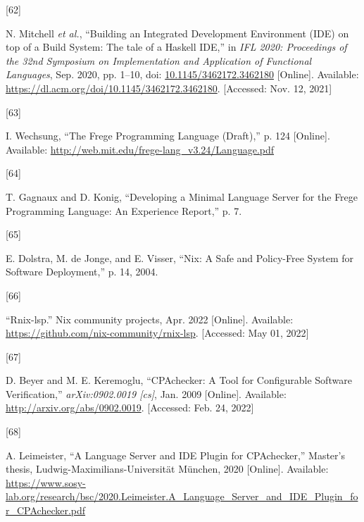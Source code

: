 \documentclass[
  a4paper,
  bibtex,
  english,
  nomenclature]{kthlatex/kththesis/kththesis}
\newlength{\cslhangindent}
\newlength{\csllabelwidth}
\newlength{\cslentryspacingunit} %
\newenvironment{CSLReferences}[2] %
 {%
  \setlength{\parindent}{0pt}
  \ifodd #1
  \let\oldpar\par
  \def\par{\hangindent=\cslhangindent\oldpar}
  \fi
  \setlength{\parskip}{#2\cslentryspacingunit}
 }%
 {}
\newcommand{\CSLLeftMargin}[1]{\parbox[t]{\csllabelwidth}{#1}}
\newcommand{\CSLRightInline}[1]{\parbox[t]{\linewidth - \csllabelwidth}{#1}\break}
\begin{document}
\begin{CSLReferences}{0}{0}
\leavevmode{}%
\CSLLeftMargin{{[}62{]} }
\CSLRightInline{N. Mitchell \emph{et al.}, {``Building an {Integrated
Development Environment} ({IDE}) on top of a {Build System}: {The} tale
of a {Haskell IDE},''} in \emph{{IFL} 2020: {Proceedings} of the 32nd
{Symposium} on {Implementation} and {Application} of {Functional
Languages}}, Sep. 2020, pp. 1--10, doi:
\href{https://doi.org/10.1145/3462172.3462180}{10.1145/3462172.3462180}
{[}Online{]}. Available:
\url{https://dl.acm.org/doi/10.1145/3462172.3462180}. {[}Accessed: Nov.
12, 2021{]}}

\leavevmode{}%
\CSLLeftMargin{{[}63{]} }
\CSLRightInline{I. Wechsung, {``The {Frege Programming Language}
({Draft}),''} p. 124 {[}Online{]}. Available:
\url{http://web.mit.edu/frege-lang_v3.24/Language.pdf}}

\leavevmode{}%
\CSLLeftMargin{{[}64{]} }
\CSLRightInline{T. Gagnaux and D. Konig, {``Developing a {Minimal
Language Server} for the {Frege Programming Language}: An {Experience
Report},''} p. 7. }

\leavevmode{}%
\CSLLeftMargin{{[}65{]} }
\CSLRightInline{E. Dolstra, M. de Jonge, and E. Visser, {``Nix: {A Safe}
and {Policy-Free System} for {Software Deployment},''} p. 14, 2004. }

\leavevmode{}%
\CSLLeftMargin{{[}66{]} }
\CSLRightInline{{``Rnix-lsp.''} Nix community projects, Apr. 2022
{[}Online{]}. Available:
\url{https://github.com/nix-community/rnix-lsp}. {[}Accessed: May 01,
2022{]}}

\leavevmode{}%
\CSLLeftMargin{{[}67{]} }
\CSLRightInline{D. Beyer and M. E. Keremoglu, {``{CPAchecker}: {A Tool}
for {Configurable Software Verification},''} \emph{arXiv:0902.0019
{[}cs{]}}, Jan. 2009 {[}Online{]}. Available:
\url{http://arxiv.org/abs/0902.0019}. {[}Accessed: Feb. 24, 2022{]}}

\leavevmode{}%
\CSLLeftMargin{{[}68{]} }
\CSLRightInline{A. Leimeister, {``A {Language Server} and {IDE Plugin}
for {CPAchecker},''} Master's thesis, Ludwig-Maximilians-Universität
München, 2020 {[}Online{]}. Available:
\url{https://www.sosy-lab.org/research/bsc/2020.Leimeister.A_Language_Server_and_IDE_Plugin_for_CPAchecker.pdf}}


\end{CSLReferences}
\end{document}

